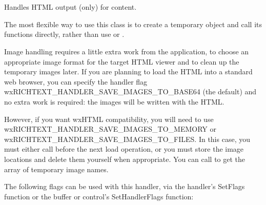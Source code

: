 \section{}\label{wxrichtexthtmlhandler}

Handles HTML output (only) for  content.

The most flexible way to use this class is to create a temporary object and call
its functions directly, rather than use  or\rtfsp
{}.

Image handling requires a little extra work from the application, to choose an
appropriate image format for the target HTML viewer and to clean up the temporary images
later. If you are planning to load the HTML into a standard web browser, you can
specify the handler flag wxRICHTEXT\_HANDLER\_SAVE\_IMAGES\_TO\_BASE64 (the default)
and no extra work is required: the images will be written with the HTML.

However, if you want wxHTML compatibility, you will need to use wxRICHTEXT\_HANDLER\_SAVE\_IMAGES\_TO\_MEMORY
or wxRICHTEXT\_HANDLER\_SAVE\_IMAGES\_TO\_FILES. In this case, you must either call  before
the next load operation, or you must store the image
locations and delete them yourself when appropriate. You can call  to
get the array of temporary image names.


The following flags can be used with this handler, via
the handler's SetFlags function or the buffer or control's
SetHandlerFlags function:

\twocolwidtha{7cm}
\begin{twocollist}\itemsep=0pt
\end{twocollist}

